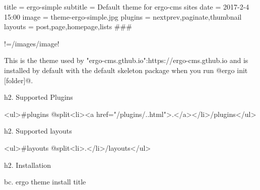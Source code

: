 title = ergo-simple
subtitle = Default theme for ergo-cms sites
date = 2017-2-4 15:00
image = theme-ergo-simple.jpg
plugins = nextprev,paginate,thumbnail
layouts = post,page,homepage,lists
###

!=/images/{{image}}!

This is the theme used by "ergo-cms.gthub.io":https://ergo-cms.gthub.io and is installed by default with the default skeleton package when you run @ergo init [folder]@.

h2. Supported Plugins

<ul>{{#plugins @split}}<li><a href="/plugins/{{.}}.html">{{.}}</a></li>{{/plugins}}</ul>

h2. Supported layouts

<ul>{{#layouts @split}}<li>{{.}}</li>{{/layouts}}</ul>

h2. Installation

bc. ergo theme install {{title}}




